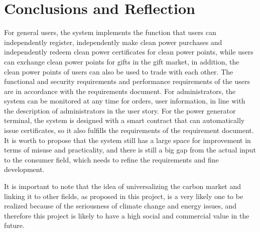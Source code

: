 \chapter{Conclusions and Reflection} \label{Chapter: Conclusions}
For general users, the system implements the function that users can independently register, independently make clean power purchases and independently redeem clean power certificates for clean power points, while users can exchange clean power points for gifts in the gift market, in addition, the clean power points of users can also be used to trade with each other. The functional and security requirements and performance requirements of the users are in accordance with the requirements document. For administrators, the system can be monitored at any time for orders, user information, in line with the description of administrators in the user story. For the power generator terminal, the system is designed with a smart contract that can automatically issue certificates, so it also fulfills the requirements of the requirement document. It is worth to propose that the system still has a large space for improvement in terms of misuse and practicality, and there is still a big gap from the actual input to the consumer field, which needs to refine the requirements and fine development.

It is important to note that the idea of universalizing the carbon market and linking it to other fields, as proposed in this project, is a very likely one to be realized because of the seriousness of climate change and energy issues, and therefore this project is likely to have a high social and commercial value in the future.
